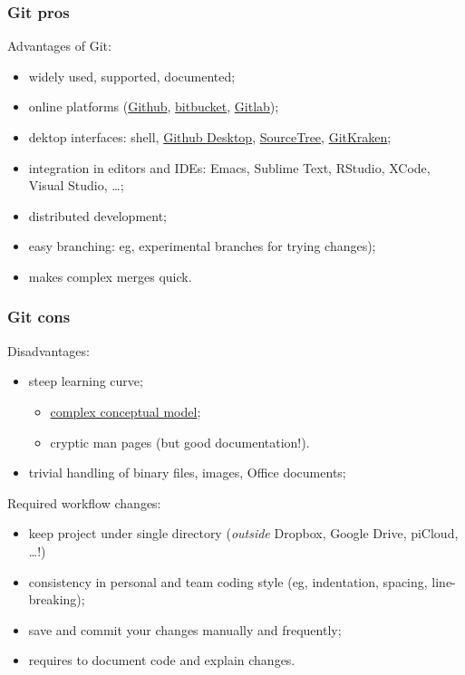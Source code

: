 \documentclass[10pt,svgnames]{beamer}
\begin{document}
\begin{frame}
\frametitle{Git pros}

Advantages of Git:
\begin{itemize}
  \item widely used, supported, documented;
  \item online platforms (\href{https://github.com/}{Github}, \href{https://bitbucket.org/}{bitbucket}, \href{https://about.gitlab.com/}{Gitlab});
  \item dektop interfaces: shell, \href{https://desktop.github.com/}{Github Desktop}, \href{https://www.sourcetreeapp.com/}{SourceTree}, \href{https://www.gitkraken.com/}{GitKraken};
  \item integration in editors and IDEs: Emacs, Sublime Text, RStudio, XCode, Visual Studio, \ldots;
  \item distributed development;
  \item easy branching: eg, experimental branches for trying changes);
  \item makes complex merges quick.
\end{itemize}
\end{frame}


\begin{frame}
\frametitle{Git cons}
\label{git_cons}

Disadvantages:
\begin{itemize}
  \item steep learning curve;
  \begin{itemize}
      \item \hyperlink{xkcd_git}{complex conceptual model};
      \item cryptic man pages (but good documentation!).
  \end{itemize}  
  \item trivial handling of binary files, images, Office documents;
\end{itemize}

Required workflow changes:
\begin{itemize}
  \item keep project under single directory (\emph{outside} Dropbox, Google Drive, piCloud, \ldots!)
  \item consistency in personal and team coding style (eg, indentation, spacing, line-breaking);
  \item save and commit your changes manually and frequently;
  \item requires to document code and explain changes.
\end{itemize}

\end{frame}
\end{document}
